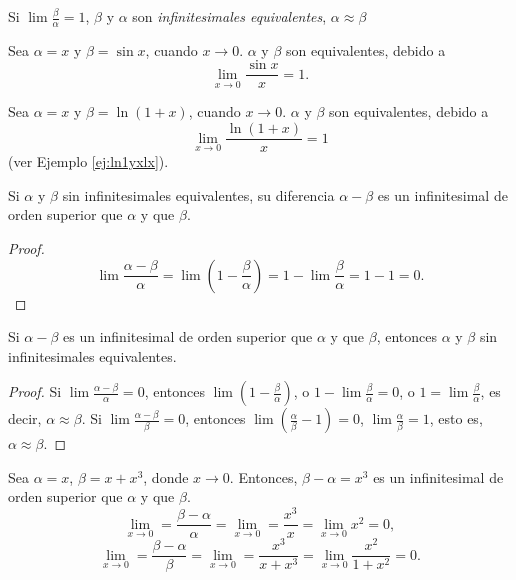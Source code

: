 \begin{definition}
  Si \( \lim \frac{\beta}{\alpha} = 1 \), \( \beta \) y \( \alpha \) son \emph{infinitesimales equivalentes}, \( \alpha \approx \beta \)
\end{definition}


\begin{example}
  Sea \( \alpha = x \) y \( \beta = \sin x \), cuando \( x \to 0 \). \( \alpha \) y \( \beta \) son equivalentes, debido a
  \[
  \lim_{x \to 0} \frac{\sin x}{x} = 1.
  \]
\end{example}


\begin{example}
  Sea \( \alpha = x \) y \( \beta = \ln (1 + x) \), cuando \( x \to 0 \). \( \alpha \) y \( \beta \) son equivalentes, debido a
  \[
  \lim_{x \to 0} \frac{\ln (1 + x)}{x} = 1
  \]
  (ver Ejemplo \ref{ej:ln1yxlx}).
\end{example}


\begin{theorem}
  Si \( \alpha \) y \( \beta \) sin infinitesimales equivalentes, su diferencia \( \alpha - \beta \) es un infinitesimal de orden superior que \( \alpha \) y que \( \beta \).
\end{theorem}

\begin{proof}
  \[
  \lim \frac{\alpha - \beta}{\alpha} = \lim \left( 1 - \frac{\beta}{\alpha} \right) = 1 - \lim \frac{\beta}{\alpha} = 1 - 1 = 0.
  \]
\end{proof}


\begin{theorem}
  Si \( \alpha - \beta \) es un infinitesimal de orden superior que \( \alpha \) y que \( \beta \), entonces \( \alpha \) y \( \beta \) sin infinitesimales equivalentes.
\end{theorem}

\begin{proof}
  Si \( \lim \frac{\alpha - \beta}{\alpha} = 0 \), entonces \( \lim \left( 1 - \frac{\beta}{\alpha} \right) \), o \( 1 - \lim \frac{\beta}{\alpha} = 0 \), o \( 1 = \lim \frac{\beta}{\alpha} \), es decir, \( \alpha \approx \beta \). Si \( \lim \frac{\alpha - \beta}{\beta} = 0 \), entonces \( \lim \left( \frac{\alpha}{\beta} - 1 \right) = 0 \), \( \lim \frac{\alpha}{\beta} = 1 \), esto es, \( \alpha \approx \beta \).
\end{proof}


\begin{example}
  Sea \( \alpha = x \), \( \beta = x + x^3 \), donde \( x \to 0 \). Entonces, \( \beta - \alpha = x^3 \) es un infinitesimal de orden superior que \( \alpha \) y que \( \beta \).
  \[
  \lim_{x \to 0} = \frac{\beta - \alpha}{\alpha} = \lim_{x \to 0} = \frac{x^3}{x} = \lim_{x \to 0} x^2 = 0,
  \]
  \[
  \lim_{x \to 0} = \frac{\beta - \alpha}{\beta} = \lim_{x \to 0} = \frac{x^3}{x + x^3} = \lim_{x \to 0} \frac{x^2}{1 + x^2} = 0.
  \]
\end{example}


